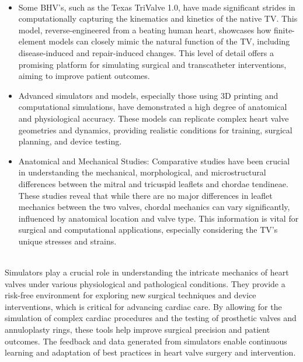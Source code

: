 \\
\begin{itemize}
    \item Some \gls{BHV}'s, such as the Texas TriValve 1.0, have made significant strides in computationally capturing the kinematics and kinetics of the native \gls{TV}. This model, reverse-engineered from a beating human heart, showcases how finite-element models can closely mimic the natural function of the \gls{TV}, including disease-induced and repair-induced changes. This level of detail offers a promising platform for simulating surgical and transcatheter interventions, aiming to improve patient outcomes. ~
    \item Advanced simulators and models, especially those using 3D printing and computational simulations, have demonstrated a high degree of anatomical and physiological accuracy. These models can replicate complex heart valve geometries and dynamics, providing realistic conditions for training, surgical planning, and device testing. ~
    \item Anatomical and Mechanical Studies: Comparative studies have been crucial in understanding the mechanical, morphological, and microstructural differences between the mitral and tricuspid leaflets and chordae tendineae. These studies reveal that while there are no major differences in leaflet mechanics between the two valves, chordal mechanics can vary significantly, influenced by anatomical location and valve type. This information is vital for surgical and computational applications, especially considering the \gls{TV}'s unique stresses and strains. ~
\end{itemize}

\\
Simulators play a crucial role in understanding the intricate mechanics of heart valves under various physiological and pathological conditions. They provide a risk-free environment for exploring new surgical techniques and device interventions, which is critical for advancing cardiac care. By allowing for the simulation of complex cardiac procedures and the testing of prosthetic valves and annuloplasty rings, these tools help improve surgical precision and patient outcomes. The feedback and data generated from simulators enable continuous learning and adaptation of best practices in heart valve surgery and intervention.

